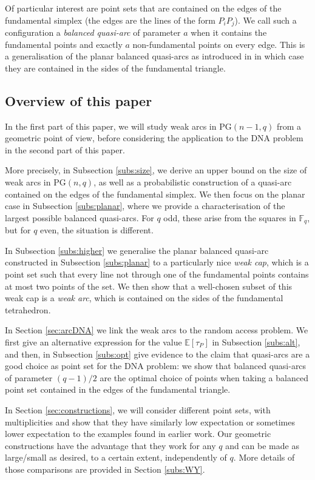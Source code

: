 \documentclass{article}
\newcommand{\PG}{\mathrm{PG}}
\newcommand{\F}{\mathbb{F}}
\newcommand{\E}{\mathbb{E}}
\begin{document}
Of particular interest are point sets that are contained on the edges of the fundamental simplex (the edges are the lines of the form $P_iP_j$). We call such a configuration a \emph{balanced quasi-arc} of parameter $a$ when it contains the fundamental points and exactly $a$ non-fundamental points on every edge. This is a generalisation of the planar balanced quasi-arcs as introduced in \cite {GruicaMontanucciZullo2026} in which case they are contained in the sides of the fundamental triangle. 

\subsection{Overview of this paper}
In the first part of this paper, we will study weak arcs in $\PG(n-1,q)$ from a geometric point of view, before considering the application to the DNA problem in the second part of this paper. 

More precisely, in Subsection \ref{subs:size}, we derive an upper bound on the size of weak arcs in $\PG(n,q)$, as well as a probabilistic construction of a quasi-arc contained on the edges of the fundamental simplex.
We then focus on the planar case in Subsection \ref{subs:planar}, where we  provide a characterisation of the largest possible balanced quasi-arcs. For $q$ odd, these arise from the squares in $\F_q$, but for $q$ even, the situation is different.

In Subsection \ref{subs:higher} we generalise the planar balanced quasi-arc constructed in Subsection \ref{subs:planar} to a particularly nice {\em weak  cap}, which is a point set such that every line not through one of the fundamental points contains at most two points of the set. We then show that a well-chosen subset of this weak cap is a {\em weak arc}, which is contained on the sides of the fundamental tetrahedron.


In Section \ref{sec:arcDNA} we link the weak arcs to the random access problem. We first give an alternative expression for the value $\E[\tau_P]$ in Subsection \ref{subs:alt}, and then, in Subsection \ref{subs:opt} give evidence to the claim that quasi-arcs are a good choice as point set for the DNA problem: we show that balanced quasi-arcs of parameter $(q-1)/2$ are the optimal choice of points when taking a balanced point set contained in the edges of the fundamental triangle.

In Section \ref{sec:constructions}, we will consider different point sets, with multiplicities and show that they have similarly low expectation or sometimes lower expectation to the examples found in earlier work. Our geometric constructions have the advantage that they work for any $q$ and can be made as large/small as desired, to a certain extent, independently of $q$. More details of those comparisons are provided in Section \ref{subs:WY}.
\end{document}
